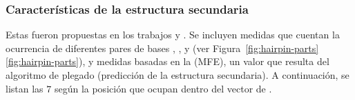 %
%
\subsubsection{Características de la estructura secundaria}
%
Estas  fueron propuestas en los trabajos \work\mipred{}
\cite{ng} y \work\micropred{} \cite{batuwita}.
Se incluyen medidas que cuentan la ocurrencia de diferentes pares de
bases , , y  (ver
\iflatexml{}Figura~\ref{fig:hairpin-parts}\else\autoref{fig:hairpin-parts}\fi{}),
y medidas basadas en la  (MFE), un valor que
resulta del algoritmo de plegado (predicción de la estructura
secundaria).
A continuación, se listan las $7$  según la posición que
ocupan dentro del vector de .
